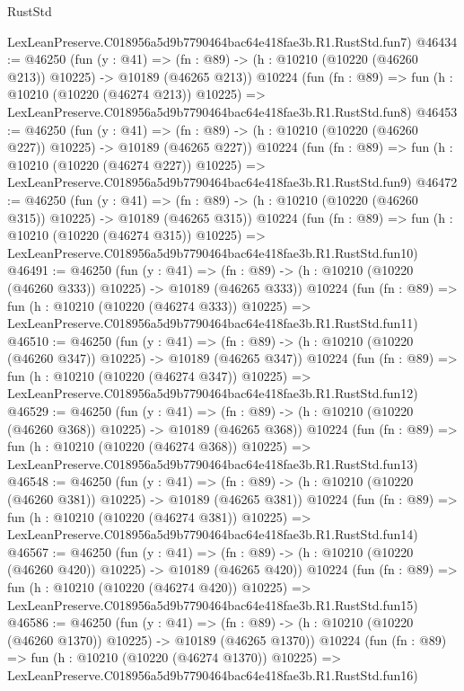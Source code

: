\begin{lexlean}{RustStd}
\begin{coremodule}
    LexLeanPreserve.C018956a5d9b7790464bac64e418fae3b.R1.RustStd.fun7)
@46434 := @46250
    (fun (y : @41) =>
    (fn : @89) -> (h : @10210 (@10220 (@46260 @213)) @10225) -> @10189 (@46265 @213))
    @10224
    (fun (fn : @89) =>
    fun (h : @10210 (@10220 (@46274 @213)) @10225) =>
    LexLeanPreserve.C018956a5d9b7790464bac64e418fae3b.R1.RustStd.fun8)
@46453 := @46250
    (fun (y : @41) =>
    (fn : @89) -> (h : @10210 (@10220 (@46260 @227)) @10225) -> @10189 (@46265 @227))
    @10224
    (fun (fn : @89) =>
    fun (h : @10210 (@10220 (@46274 @227)) @10225) =>
    LexLeanPreserve.C018956a5d9b7790464bac64e418fae3b.R1.RustStd.fun9)
@46472 := @46250
    (fun (y : @41) =>
    (fn : @89) -> (h : @10210 (@10220 (@46260 @315)) @10225) -> @10189 (@46265 @315))
    @10224
    (fun (fn : @89) =>
    fun (h : @10210 (@10220 (@46274 @315)) @10225) =>
    LexLeanPreserve.C018956a5d9b7790464bac64e418fae3b.R1.RustStd.fun10)
@46491 := @46250
    (fun (y : @41) =>
    (fn : @89) -> (h : @10210 (@10220 (@46260 @333)) @10225) -> @10189 (@46265 @333))
    @10224
    (fun (fn : @89) =>
    fun (h : @10210 (@10220 (@46274 @333)) @10225) =>
    LexLeanPreserve.C018956a5d9b7790464bac64e418fae3b.R1.RustStd.fun11)
@46510 := @46250
    (fun (y : @41) =>
    (fn : @89) -> (h : @10210 (@10220 (@46260 @347)) @10225) -> @10189 (@46265 @347))
    @10224
    (fun (fn : @89) =>
    fun (h : @10210 (@10220 (@46274 @347)) @10225) =>
    LexLeanPreserve.C018956a5d9b7790464bac64e418fae3b.R1.RustStd.fun12)
@46529 := @46250
    (fun (y : @41) =>
    (fn : @89) -> (h : @10210 (@10220 (@46260 @368)) @10225) -> @10189 (@46265 @368))
    @10224
    (fun (fn : @89) =>
    fun (h : @10210 (@10220 (@46274 @368)) @10225) =>
    LexLeanPreserve.C018956a5d9b7790464bac64e418fae3b.R1.RustStd.fun13)
@46548 := @46250
    (fun (y : @41) =>
    (fn : @89) -> (h : @10210 (@10220 (@46260 @381)) @10225) -> @10189 (@46265 @381))
    @10224
    (fun (fn : @89) =>
    fun (h : @10210 (@10220 (@46274 @381)) @10225) =>
    LexLeanPreserve.C018956a5d9b7790464bac64e418fae3b.R1.RustStd.fun14)
@46567 := @46250
    (fun (y : @41) =>
    (fn : @89) -> (h : @10210 (@10220 (@46260 @420)) @10225) -> @10189 (@46265 @420))
    @10224
    (fun (fn : @89) =>
    fun (h : @10210 (@10220 (@46274 @420)) @10225) =>
    LexLeanPreserve.C018956a5d9b7790464bac64e418fae3b.R1.RustStd.fun15)
@46586 := @46250
    (fun (y : @41) =>
    (fn : @89) -> (h : @10210 (@10220 (@46260 @1370)) @10225) -> @10189 (@46265 @1370))
    @10224
    (fun (fn : @89) =>
    fun (h : @10210 (@10220 (@46274 @1370)) @10225) =>
    LexLeanPreserve.C018956a5d9b7790464bac64e418fae3b.R1.RustStd.fun16)

\end{coremodule}
\end{lexlean}
